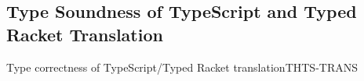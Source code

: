 \documentclass[acmlarge, anonymous, authordraft, review]{acmart} %
\begin{document}

\subsection*{Type Soundness of TypeScript and Typed Racket Translation}

\begin{lemma}{Type correctness of TypeScript/Typed Racket translation}{THTS-TRANS}
  \begin{conds}
    \cond{$\TR\K = \Kp$}
    \cond{$\TR\Env = \Envp$}
  \end{conds}

  \then\axiom{$\EnvType\Envp\cdot\Kp{\TRG{\e}\Env}{\any}$}


\end{lemma}
\end{document}
